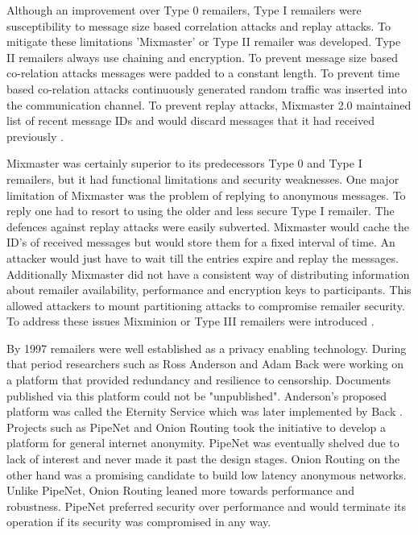 \documentclass{llncs}
\begin{document}
Although an improvement over Type 0 remailers, Type I remailers were susceptibility to message size based correlation attacks and replay attacks. To mitigate these limitations 'Mixmaster' or Type II remailer was developed. Type II remailers always use chaining and encryption. To prevent message size based co-relation attacks messages were padded to a constant length. To prevent time based co-relation attacks continuously generated random traffic was inserted into the communication channel. To prevent replay attacks, Mixmaster 2.0 maintained list of recent message IDs and would discard messages that it had received previously \cite{mixmaster-spec}.

Mixmaster was certainly superior to its predecessors Type 0 and Type I remailers, but it had functional limitations and security weaknesses. One major limitation of Mixmaster was the problem of replying to anonymous messages. To reply one had to resort to using the older and less secure Type I remailer. The defences against replay attacks were easily subverted. Mixmaster would cache the ID's of received messages but would store them for a fixed interval of time. An attacker would just have to wait till the entries expire and replay the messages. Additionally Mixmaster did not have a consistent way of distributing information about remailer availability, performance and encryption keys to participants. This allowed attackers to mount partitioning attacks to compromise remailer security. To address these issues Mixminion or Type III remailers were introduced \cite{minion-design}.

By 1997 remailers were well established as a privacy enabling technology. During that period researchers such as Ross Anderson and Adam Back were working on a platform that provided redundancy and resilience to censorship. Documents published via this platform could not be "unpublished". Anderson's proposed platform was called the Eternity Service \cite{anderson96eternity} which was later implemented by Back \cite{back:usenet}. Projects such as PipeNet\cite{pipenet10} and Onion Routing \cite{onion-routing:ih96} took the initiative to develop a platform for general internet anonymity. PipeNet was eventually shelved due to lack of interest and never made it past the design stages. Onion Routing on the other hand was a promising candidate to build low latency anonymous networks. Unlike PipeNet, Onion Routing leaned more towards performance and robustness. PipeNet preferred security over performance and would terminate its operation if its security was compromised in any way.
\end{document}

